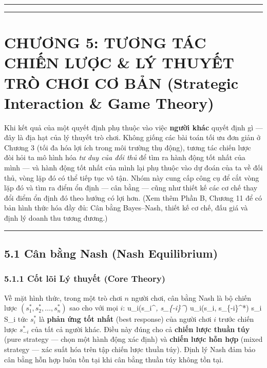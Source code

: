 \documentclass[
]{article}
\begin{document}
\begin{center}\rule{0.5\linewidth}{0.5pt}\end{center}

\begin{center}\rule{0.5\linewidth}{0.5pt}\end{center}

\section{CHƯƠNG 5: TƯƠNG TÁC CHIẾN LƯỢC \& LÝ THUYẾT TRÒ CHƠI CƠ BẢN
(Strategic Interaction \& Game
Theory)}\label{chux1b0ux1a1ng-5-tux1b0ux1a1ng-tuxe1c-chiux1ebfn-lux1b0ux1ee3c-luxfd-thuyux1ebft-truxf2-chux1a1i-cux1a1-bux1ea3n-strategic-interaction-game-theory}

Khi kết quả của một quyết định phụ thuộc vào việc \textbf{người khác}
quyết định gì --- đây là địa hạt của lý thuyết trò chơi. Không giống các
bài toán tối ưu đơn giản ở Chương 3 (tối đa hóa lợi ích trong môi trường
thụ động), tương tác chiến lược đòi hỏi ta mô hình hóa \emph{tư duy của
đối thủ} để tìm ra hành động tốt nhất của mình --- và hành động tốt nhất
của mình lại phụ thuộc vào dự đoán của ta về đối thủ, vòng lặp đó có thể
tiếp tục vô tận. Nhóm này cung cấp công cụ để cắt vòng lặp đó và tìm ra
điểm ổn định --- cân bằng --- cũng như thiết kế các cơ chế thay đổi điểm
ổn định đó theo hướng có lợi hơn. (Xem thêm Phần B, Chương 11 để có bản
hình thức hóa đầy đủ: Cân bằng Bayes--Nash, thiết kế cơ chế, đấu giá và
định lý doanh thu tương đương.)

\begin{center}\rule{0.5\linewidth}{0.5pt}\end{center}

\subsection{5.1 Cân bằng Nash (Nash
Equilibrium)}\label{cuxe2n-bux1eb1ng-nash-nash-equilibrium}

\subsubsection{5.1.1 Cốt lõi Lý thuyết (Core
Theory)}\label{cux1ed1t-luxf5i-luxfd-thuyux1ebft-core-theory-1}

Về mặt hình thức, trong một trò chơi \(n\) người chơi, cân bằng Nash là
bộ chiến lược \((s_1^*, s_2^*, \ldots, s_n^*)\) sao cho với mọi \(i\):
u\_i(s\_i\^{}\emph{, s\_\{-i\}\^{}}) \ge u\_i(s\_i, s\_\{-i\}\^{}*)
\quad \forall s\_i \in S\_i tức \(s_i^*\) là \textbf{phản ứng tốt nhất}
(best response) của người chơi \(i\) trước chiến lược \(s_{-i}^*\) của
tất cả người khác. Điều này đúng cho cả \textbf{chiến lược thuần túy}
(pure strategy --- chọn một hành động xác định) và \textbf{chiến lược
hỗn hợp} (mixed strategy --- xác suất hóa trên tập chiến lược thuần
túy). Định lý Nash đảm bảo cân bằng hỗn hợp luôn tồn tại khi cân bằng
thuần túy không tồn tại.
\end{document}
